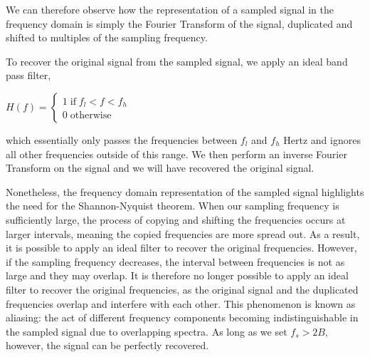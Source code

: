 \documentclass{article}
\begin{document}
We can therefore observe how the representation of a sampled signal in the frequency domain is simply the Fourier Transform of the signal, duplicated and shifted to multiples of the sampling frequency.

To recover the original signal from the sampled signal, we apply an ideal band pass filter,
\begin{center}
    \begin{math}
        H(f) =
        \begin{cases}
            1 \; \text{if} \; f_l < f < f_h \\
            0 \; \text{otherwise}
        \end{cases}
    \end{math}  
\end{center}

which essentially only passes the frequencies between $f_l$ and $f_h$ Hertz and ignores all other frequencies outside of this range.
We then perform an inverse Fourier Transform on the signal and we will have recovered the original signal.

Nonetheless, the frequency domain representation of the sampled signal highlights the need for the Shannon-Nyquist theorem. %
When our sampling frequency is sufficiently large, the process of copying and shifting the frequencies occurs at larger intervals, meaning the copied frequencies are more spread out. 
As a result, it is possible to apply an ideal filter to recover the original frequencies. 
However, if the sampling frequency decreases, the interval between frequencies is not as large and they may overlap. It is therefore no longer possible to apply an ideal filter to recover the original frequencies, as the original signal and the duplicated frequencies overlap and interfere with each other.
This phenomenon is known as aliasing: the act of different frequency components becoming indistinguishable in the sampled signal due to overlapping spectra. %
As long as we set $f_s > 2B$, however, the signal can be perfectly recovered. 


\end{document}
